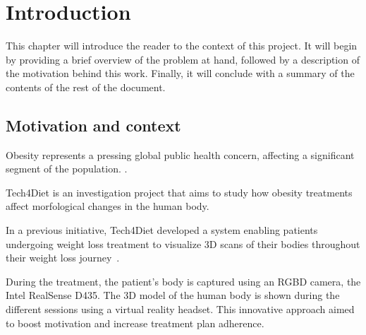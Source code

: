 
\chapter{Introduction}

This chapter will introduce the reader to the context of this project. It will
begin by providing a brief overview of the problem at hand, followed by a
description of the motivation behind this work. Finally, it will conclude with
a summary of the contents of the rest of the document.

\section{Motivation and context}

Obesity represents a pressing global public health concern, affecting a
significant segment of the population. .

Tech4Diet is an investigation project that aims to study how obesity treatments
affect morfological changes in the human body. 

In a previous initiative,  Tech4Diet developed a system enabling
patients undergoing weight loss treatment to visualize 3D scans of their bodies
throughout their weight loss journey~\cite{Azorin-Lopez2020}.

During the treatment, the patient's body is captured using an RGBD camera, the
Intel RealSense D435. The 3D model of the human body is shown during the
different sessions using a virtual reality headset. This innovative approach
aimed to boost motivation and increase treatment plan adherence.

